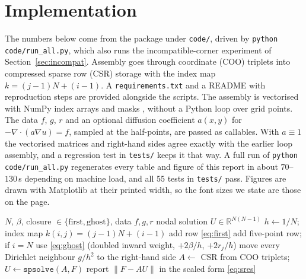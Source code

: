 \documentclass[11pt,a4paper]{article}
\theoremstyle{palplain}
\theoremstyle{paldef}
\theoremstyle{palremark}
\begin{document}
\section{Implementation}\label{sec:impl}
\begin{sloppypar}The numbers below come from the package under \texttt{code/}, driven by
\texttt{python code/run\_all.py}, which also runs the incompatible-corner experiment of
Section~\ref{sec:incompat}. Assembly goes through coordinate (COO) triplets into compressed
sparse row (CSR) storage with the index map
$k=(j-1)N+(i-1)$. A \texttt{requirements.txt} and a README with reproduction steps are provided
alongside the scripts. The assembly is vectorised with NumPy index arrays and masks \cite{numpy},
without a Python loop over grid points. The data $f$, $g$, $r$ and an optional diffusion
coefficient $a(x,y)$ for $-\nabla\cdot(a\nabla u)=f$, sampled at the half-points, are passed as
callables. With $a\equiv1$ the vectorised matrices and right-hand sides agree exactly with the
earlier loop assembly, and a regression test in \texttt{tests/} keeps it that way. A full run of
\texttt{python code/run\_all.py} regenerates every table and figure of this report in about
$70$--$130$\,s depending on machine load, and all 55 tests in \texttt{tests/} pass. Figures are drawn with
Matplotlib \cite{matplotlib} at their printed width, so the font sizes we state are those on the
page.\end{sloppypar}

\begin{algorithm}[H]
\caption{Assembly and solve for one closure (as in \texttt{solver.py}/\texttt{run\_all.py})}
\begin{algorithmic}[1]
\Require $N$, $\beta$, closure $\in\{\text{first},\text{ghost}\}$, data $f,g,r$
\Ensure nodal solution $U\in\mathbb R^{N(N-1)}$
\State $h\gets1/N$; index map $k(i,j)=(j-1)N+(i-1)$
   \State add row \eqref{eq:first}
  \Else \State add five-point row; if $i=N$ use \eqref{eq:ghost} (doubled inward weight, $+2\beta/h$, $+2r_j/h$)
  \EndIf
  \State move every Dirichlet neighbour $g/h^2$ to the right-hand side
\EndFor
\State $A\gets$ CSR from COO triplets; $U\gets\texttt{spsolve}(A,F)$
\State report $\|F-AU\|$ in the scaled form \eqref{eq:sres}
\end{algorithmic}
\end{algorithm}
\end{document}
